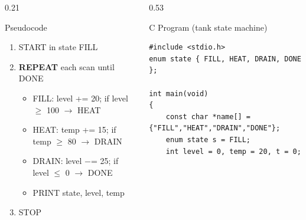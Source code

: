 \documentclass[aspectratio=169]{beamer}
\begin{document}
	\begin{frame}{}

		\vspace*{0.05cm}

		\begin{columns}[T,onlytextwidth]


			\begin{column}{0.21\textwidth}

				\begin{block}{Pseudocode}
					\scriptsize
					\begin{enumerate}
						\item START in state FILL
						\item \textbf{REPEAT} each scan until DONE
						\begin{itemize}\scriptsize
							\item FILL: level += 20; if level $\ge$ 100 $\to$ HEAT
							\item HEAT: temp += 15; if temp $\ge$ 80 $\to$ DRAIN
							\item DRAIN: level $-$= 25; if level $\le$ 0 $\to$ DONE
							\item PRINT state, level, temp
						\end{itemize}
						\item STOP
					\end{enumerate}
				\end{block}

			\end{column}


			\hspace*{0.3cm}
			\begin{column}{0.53\textwidth}

				\begin{block}{C Program (tank state machine)}

\begin{lstlisting}[style=cstyle,numbers=none,basicstyle=\ttfamily\scriptsize]
#include <stdio.h>
enum state { FILL, HEAT, DRAIN, DONE };

int main(void)
{
	const char *name[] = {"FILL","HEAT","DRAIN","DONE"};
	enum state s = FILL;
	int level = 0, temp = 20, t = 0;


\end{lstlisting}
\end{block}
\end{column}
\end{columns}
\end{frame}
\end{document}
